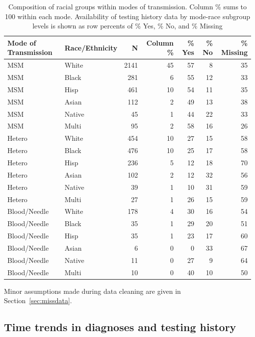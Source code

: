 \documentclass{article}\usepackage[]{graphicx}\usepackage[]{color}
\begin{document}
\begin{table}[!h]
\centering
\caption{Composition of racial groups within modes of transmission. Column \% sums to 100 within each mode. Availability of testing history data by mode-race subgroup levels is shown as row percents of \% Yes, \% No, and \% Missing} 
\label{tab:sampleracebydx}
{\small
\begin{tabular}{llrrrrr}
  \hline
Mode of Transmission & Race/Ethnicity & N & Column  \%  &  \%  Yes &  \%  No &  \%  Missing \\ 
  \hline
MSM & White & 2141 & 45 & 57 & 8 & 35 \\ 
  MSM & Black & 281 & 6 & 55 & 12 & 33 \\ 
  MSM & Hisp & 461 & 10 & 54 & 11 & 35 \\ 
  MSM & Asian & 112 & 2 & 49 & 13 & 38 \\ 
  MSM & Native & 45 & 1 & 44 & 22 & 33 \\ 
  MSM & Multi & 95 & 2 & 58 & 16 & 26 \\ 
  Hetero & White & 454 & 10 & 27 & 15 & 58 \\ 
  Hetero & Black & 476 & 10 & 25 & 17 & 58 \\ 
  Hetero & Hisp & 236 & 5 & 12 & 18 & 70 \\ 
  Hetero & Asian & 102 & 2 & 12 & 32 & 56 \\ 
  Hetero & Native & 39 & 1 & 10 & 31 & 59 \\ 
  Hetero & Multi & 27 & 1 & 26 & 15 & 59 \\ 
  Blood/Needle & White & 178 & 4 & 30 & 16 & 54 \\ 
  Blood/Needle & Black & 35 & 1 & 29 & 20 & 51 \\ 
  Blood/Needle & Hisp & 35 & 1 & 23 & 17 & 60 \\ 
  Blood/Needle & Asian & 6 & 0 & 0 & 33 & 67 \\ 
  Blood/Needle & Native & 11 & 0 & 27 & 9 & 64 \\ 
  Blood/Needle & Multi & 10 & 0 & 40 & 10 & 50 \\ 
   \hline
\end{tabular}
}
\end{table}


Minor assumptions made during data cleaning are given in Section~\ref{sec:missdata}.

\label{sec:sample}
\subsection{Time trends in diagnoses and testing history}
\end{document}
